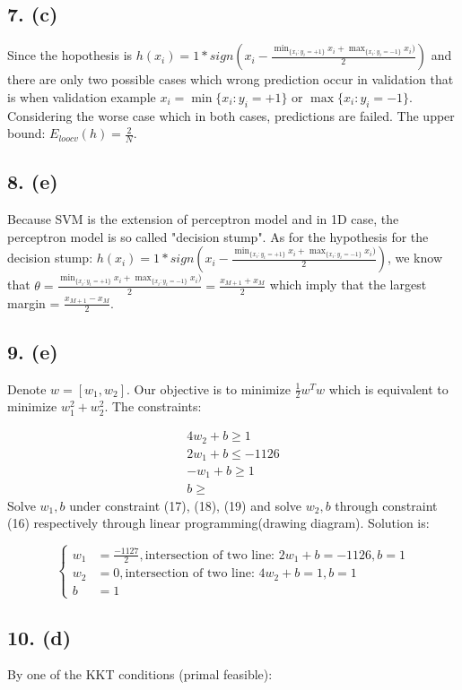 \documentclass[12pt,a4paper]{article}
\begin{document}
\subsection{7. (c)}
Since the hopothesis is $h(x_i) = 1*sign(x_i - \frac{\min_{\{x_i: y_i=+1\}} x_i + \max_{\{x_i: y_i=-1\}} x_i)}{2})$ and there are only two possible cases which wrong prediction occur in validation that is when validation example $x_i = \min \{x_i: y_i=+1\}$ or $\max \{x_i: y_i=-1\}$. Considering  the worse case which in both cases, predictions are failed. The upper bound: $E_{loocv}(h) = \frac{2}{N}$.

\subsection{8. (e)}
Because SVM is the extension of perceptron model and in 1D case, the perceptron model is so called "decision stump". As for the hypothesis for the decision stump:  $h(x_i) = 1*sign(x_i - \frac{\min_{\{x_i: y_i=+1\}} x_i + \max_{\{x_i: y_i=-1\}} x_i)}{2})$, we  know that $\theta = \frac{\min_{\{x_i: y_i=+1\}} x_i + \max_{\{x_i: y_i=-1\}} x_i)}{2} = \frac{x_{M+1}+x_M}{2}$  which imply that the largest margin = $\frac{x_{M+1}-x_M}{2}$.

\subsection{9. (e)}
Denote $w = [w_1, w_2]$. Our objective is to minimize $\frac{1}{2}w^Tw$ which is equivalent to minimize $w_1^2+w_2^2$. The constraints:


\begin{align}
    4w_2+b \ge 1 \\
    2w_1 + b \le -1126 \\
    -w_1 + b \ge 1 \\
    b \ge
\end{align}
Solve $w_1, b$ under constraint (17), (18), (19) and solve $w_2, b$ through constraint (16) respectively through linear programming(drawing diagram). Solution is:

\[
\begin{cases}
    w_1 &= \frac{-1127}{2}, \text{intersection of two line: } 2w_1+b=-1126, b=1 \\
    w_2 &= 0, \text{intersection of two line: } 4w_2+b=1, b=1 \\
    b &= 1
\end{cases}
\]
\subsection{10. (d)}
By one of the KKT conditions (primal feasible):
\end{document}
